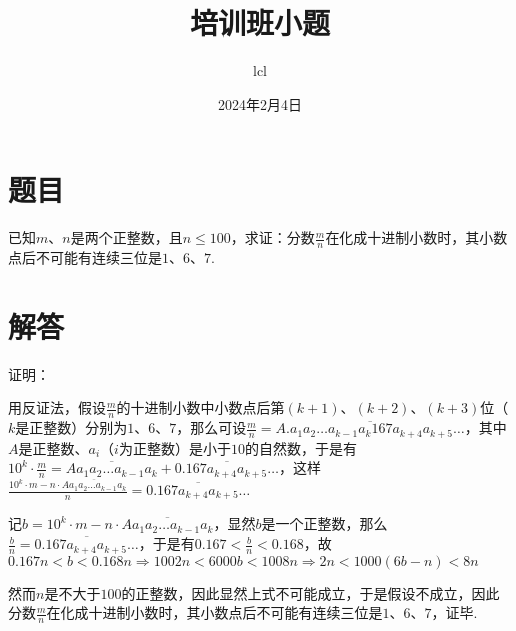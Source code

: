 \documentclass[11pt]{article}
\title{培训班小题}
\date{2024年2月4日}
\author{lcl}
\begin{document}
\maketitle
\section*{题目}
已知$m$、$n$是两个正整数，且$n \leq 100$，求证：分数$\frac{m}{n}$在化成十进制小数时，其小数点后不可能有连续三位是$1$、$6$、$7$.
\section*{解答}
证明：\par
用反证法，假设$\frac{m}{n}$的十进制小数中小数点后第$(k+1)$、$(k+2)$、$(k+3)$位（$k$是正整数）分别为$1$、$6$、$7$，那么可设$\frac{m}{n}=\overline{A.a_1a_2 \dots a_{k-1}a_k167a_{k+4}a_{k+5} \dots}$，其中$A$是正整数、$a_i$（$i$为正整数）是小于$10$的自然数，于是有$10^k \cdot \frac{m}{n}=\overline{Aa_1a_2 \dots a_{k-1}a_k}+\overline{0.167a_{k+4}a_{k+5}\dots}$，这样$\frac{10^k \cdot m - n \cdot \overline{Aa_1a_2 \dots a_{k-1}a_k}}{n} = \overline{0.167a_{k+4}a_{k+5}\dots}$ \par
记$b=10^k \cdot m - n \cdot \overline{Aa_1a_2 \dots a_{k-1}a_k}$，显然$b$是一个正整数，那么$\frac{b}{n}=\overline{0.167a_{k+4}a_{k+5}\dots}$，于是有$0.167 < \frac{b}{n} < 0.168$，故$0.167n < b < 0.168n \Rightarrow 1002n < 6000b < 1008n \Rightarrow 2n < 1000(6b-n) <8n$ \par
然而$n$是不大于$100$的正整数，因此显然上式不可能成立，于是假设不成立，因此分数$\frac{m}{n}$在化成十进制小数时，其小数点后不可能有连续三位是$1$、$6$、$7$，证毕.
\end{document}
